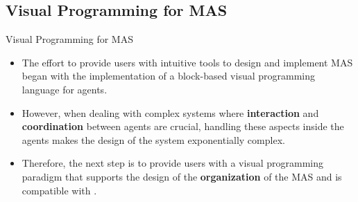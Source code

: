 \subsection{Visual Programming for MAS}
\begin{frame}{Visual Programming for MAS}
    \begin{itemize}
        \item The effort to provide users with intuitive tools to design and implement MAS began with the implementation of a block-based visual programming language for agents.~\cite{burattini2022agent}
        \vspace{0.5cm}
        \item However, when dealing with complex systems where \textbf{interaction} and \textbf{coordination} between agents are crucial, handling these aspects inside the agents makes the design of the system exponentially complex.
        \vspace{0.5cm}
        \item Therefore, the next step is to provide users with a visual programming paradigm that supports the design of the \textbf{organization} of the MAS and is compatible with \moise{}.
    \end{itemize}
\end{frame}